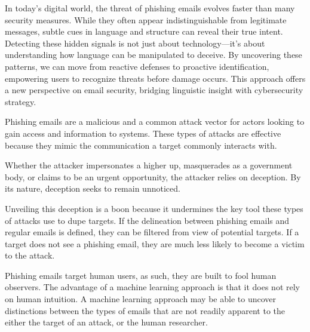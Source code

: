 \documentclass[article,pdftex,10pt,a4paper,twocolumn]{article}
\begin{document}



In today’s digital world, the threat of phishing emails evolves faster than many security measures. While they often appear indistinguishable from legitimate messages, subtle cues in language and structure can reveal their true intent. Detecting these hidden signals is not just about technology—it’s about understanding how language can be manipulated to deceive. By uncovering these patterns, we can move from reactive defenses to proactive identification, empowering users to recognize threats before damage occurs. This approach offers a new perspective on email security, bridging linguistic insight with cybersecurity strategy.

Phishing emails are a malicious and a common attack vector for actors looking to gain access and information to systems. These types of attacks are effective because they mimic the communication a target commonly interacts with.

Whether the attacker impersonates a higher up, masquerades as a government body, or claims to be an urgent opportunity, the attacker relies on deception. By its nature, deception seeks to remain unnoticed.

Unveiling this deception is a boon because it undermines the key tool these types of attacks use to dupe targets. If the delineation between phishing emails and regular emails is defined, they can be filtered from view of potential targets. If a target does not see a phishing email, they are much less likely to become a victim to the attack.

Phishing emails target human users, as such, they are built to fool human observers. The advantage of a machine learning approach is that it does not rely on human intuition. A machine learning approach may be able to uncover distinctions between the types of emails that are not readily apparent to the either the target of an attack, or the human researcher.
\end{document}
